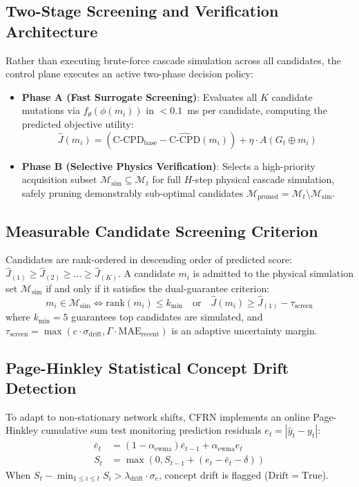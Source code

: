 \documentclass[pdflatex,sn-mathphys-num]{sn-jnl}
\theoremstyle{thmstyleone}
\theoremstyle{thmstyletwo}
\theoremstyle{thmstylethree}
\begin{document}
\subsection{Two-Stage Screening and Verification Architecture}
Rather than executing brute-force cascade simulation across all candidates, the control plane executes an active two-phase decision policy:
\begin{itemize}
    \item \textbf{Phase A (Fast Surrogate Screening)}: Evaluates all $K$ candidate mutations via $f_\theta(\phi(m_i))$ in $< 0.1$~ms per candidate, computing the predicted objective utility:
    \begin{equation}
    \hat{J}(m_i) = (\mathrm{C\text{-}CPD}_{\mathrm{base}} - \hat{\mathrm{C\text{-}CPD}}(m_i)) + \eta \cdot A(G_t \oplus m_i)
    \end{equation}
    \item \textbf{Phase B (Selective Physics Verification)}: Selects a high-priority acquisition subset $\mathcal{M}_{\mathrm{sim}} \subseteq \mathcal{M}_t$ for full $H$-step physical cascade simulation, safely pruning demonstrably sub-optimal candidates $\mathcal{M}_{\mathrm{pruned}} = \mathcal{M}_t \setminus \mathcal{M}_{\mathrm{sim}}$.
\end{itemize}

\subsection{Measurable Candidate Screening Criterion}
Candidates are rank-ordered in descending order of predicted score: $\hat{J}_{(1)} \ge \hat{J}_{(2)} \ge \dots \ge \hat{J}_{(K)}$. A candidate $m_i$ is admitted to the physical simulation set $\mathcal{M}_{\mathrm{sim}}$ if and only if it satisfies the dual-guarantee criterion:
\begin{equation}
m_i \in \mathcal{M}_{\mathrm{sim}} \iff \mathrm{rank}(m_i) \le k_{\min} \quad \text{or} \quad \hat{J}(m_i) \ge \hat{J}_{(1)} - \tau_{\mathrm{screen}}
\end{equation}
where $k_{\min} = 5$ guarantees top candidates are simulated, and $\tau_{\mathrm{screen}} = \max(c \cdot \sigma_{\mathrm{drift}}, \Gamma \cdot \mathrm{MAE}_{\mathrm{recent}})$ is an adaptive uncertainty margin.

\subsection{Page-Hinkley Statistical Concept Drift Detection}
To adapt to non-stationary network shifts, CFRN implements an online Page-Hinkley cumulative sum test \cite{page1954continuous,gama2014survey} monitoring prediction residuals $e_t = |\hat{y}_t - y_t|$:
\begin{align}
\bar{e}_t &= (1 - \alpha_{\mathrm{ewma}}) \bar{e}_{t-1} + \alpha_{\mathrm{ewma}} e_t \\
S_t &= \max(0, S_{t-1} + (e_t - \bar{e}_t - \delta))
\end{align}
When $S_t - \min_{1 \le i \le t} S_i > \lambda_{\mathrm{drift}} \cdot \sigma_e$, concept drift is flagged ($\mathrm{Drift} = \mathrm{True}$).
\end{document}
